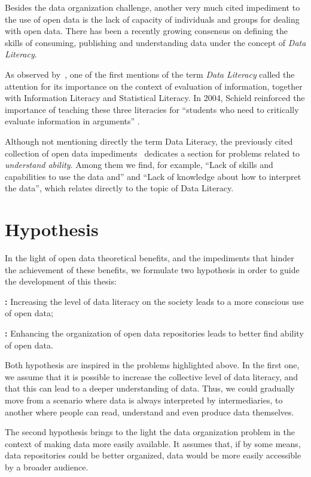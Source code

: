 Besides the data organization challenge, another very much cited impediment to the use of open data is the lack of capacity of individuals and groups for dealing with open data.
There has been a recently growing consensus on defining the skills of consuming, publishing and understanding data under the concept of \emph{Data Literacy}.

As observed by~, one of the first mentions of the term \emph{Data Literacy} called the attention for its importance on the context of evaluation of information, together with  Information Literacy and Statistical Literacy. 
In 2004, Schield reinforced the importance of teaching these three literacies for ``students who need to critically evaluate information in arguments'' \cite[p.1]{Schield2004}.

Although not mentioning directly the term Data Literacy, the previously cited collection of open data impediments~\cite{Zuiderwijk2012} dedicates a section for problems related to \emph{understand ability}.
Among them we find, for example, ``Lack of skills and capabilities to use the data and'' and ``Lack of knowledge about how to interpret the data'', which relates directly to the topic of Data Literacy.

\section{Hypothesis}

In the light of open data theoretical benefits, and the impediments that hinder the achievement of these benefits, we formulate two hypothesis in order to guide the development of this thesis:

\noindent\textbf{:} Increasing the level of data literacy on the society leads to a more conscious use of open data;

\noindent\textbf{:} Enhancing the organization of open data repositories leads to better find ability of open data.

Both hypothesis are inspired in the problems highlighted above.
In the first one, we assume that it is possible to increase the collective level of data literacy, and that this can lead to a deeper understanding of data.
Thus, we could gradually move from a scenario where data is always interpreted by intermediaries, to another where people can read, understand and even produce data themselves.

The second hypothesis brings to the light the data organization problem in the context of making data more easily available.
It assumes that, if by some means, data repositories could be better organized, data would be more easily accessible by a broader audience.

